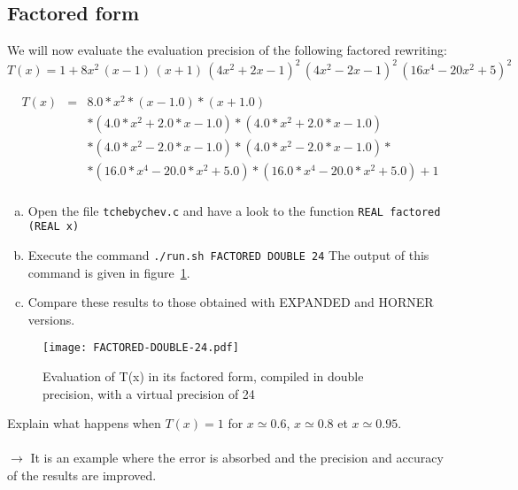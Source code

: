 \subsection{Factored form}

We will now evaluate the evaluation precision of the following factored rewriting:
\[
	T(x) = 1 + 8x^2\,(x-1)\,(x+1)\,(4x^2 + 2x - 1)^2\, (4x^2 - 2x - 1)^2\,(16x^4 - 20x^2 + 5)^2
\]

\begin{eqnarray*}
T(x) &=& 8.0*x^2*(x - 1.0)*(x + 1.0) \\
 & & * (4.0*x^2 + 2.0*x - 1.0)*(4.0*x^2 + 2.0*x - 1.0) \\
 & & * (4.0*x^2 - 2.0*x - 1.0)*(4.0*x^2 - 2.0*x - 1.0)* \\
 & & * (16.0*x^4 - 20.0*x^2 + 5.0)*(16.0*x^4 - 20.0*x^2 + 5.0) + 1 \\
\end{eqnarray*}

\begin{question}
  \begin{enumerate}[(a)]
  \item Open the file {\tt tchebychev.c} and have a look to the function {\tt REAL factored (REAL x)}
\item Execute the command {\tt ./run.sh FACTORED DOUBLE 24} \newline
The output of this command is given in figure~\ref{fig:factored:double:24}.
\item Compare these results to those obtained with EXPANDED and HORNER versions.
  \end{enumerate}
\end{question}

\begin{figure}[h]
\center \texttt{[image: FACTORED-DOUBLE-24.pdf]}
  \caption{Evaluation of T(x) in its factored form, compiled in double precision, with a virtual precision of 24}
  \label{fig:factored:double:24}
\end{figure}

\begin{question}
  Explain what happens when $T(x)=1$ for $x\simeq 0.6$,
  $x\simeq 0.8$ et $x\simeq 0.95$.\\~\\
  $\rightarrow$ It is an example where the error is absorbed and the precision and accuracy  of the results are improved.
\end{question}


